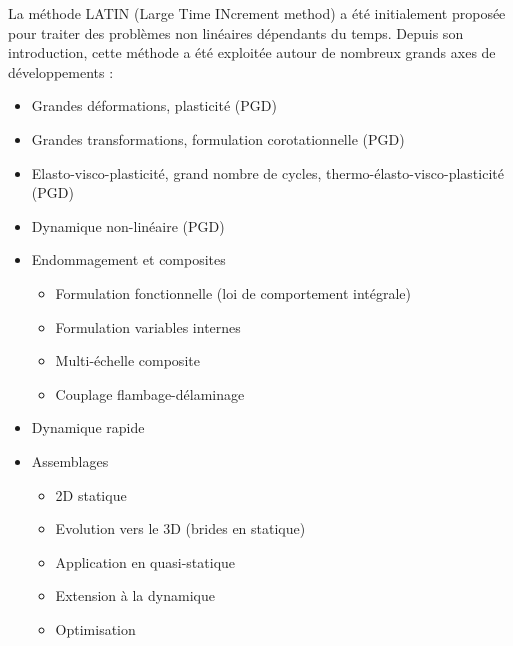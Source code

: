 La méthode LATIN (Large Time INcrement method) \cite{Lad85,Lad89,Lad99} a été initialement proposée pour traiter des problèmes non linéaires dépendants  du temps. Depuis son introduction, cette méthode a été exploitée autour de nombreux grands axes de développements :\\
\begin{itemize}
\item Grandes déformations, plasticité (PGD)
\cite{Bussy1984,Vauchez1991,Liu1992}\\

\item Grandes transformations, formulation corotationnelle (PGD)
\cite{Boucard1996b,Michel-Ponnelle2001b}\\

\item Elasto-visco-plasticité, grand nombre de cycles, thermo-élasto-visco-plasticité (PGD)
\cite{Cognard1989,Arzt1994,Cognard1999}\\

\item Dynamique non-linéaire (PGD)
\cite{Royer1990}\\

\item Endommagement et composites\\
\begin{itemize}
\item Formulation fonctionnelle (loi de comportement intégrale) \cite{Allix1992,Guinard2002}
\item Formulation variables internes \cite{Douchin2000b}
\item Multi-échelle composite \cite{Trovalet2010}
\item Couplage flambage-délaminage \cite{Saavedra-Redlich2012b}\\
\end{itemize}

\item Dynamique rapide \cite{Lemoussu2000b,Derumaux2004b,Sen-Gupta2005b}\\

\item Assemblages\\
\begin{itemize}
\item 2D statique \cite{Danwe1993}
\item Evolution vers le 3D (brides en statique) \cite{Champaney1996b}
\item Application en quasi-statique \cite{Blanze2000}
\item Extension à la dynamique \cite{Lemoussu2000b}
\item Optimisation \cite{Boucard10,Laurent2013}\\
\end{itemize}


\end{itemize}
